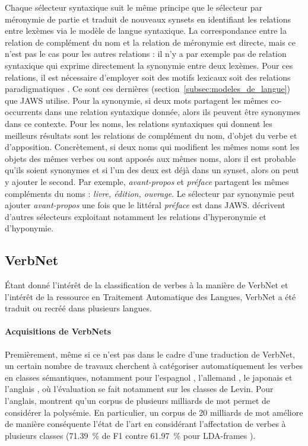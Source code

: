 Chaque sélecteur syntaxique suit le même principe que le sélecteur par
méronymie de partie et traduit de nouveaux synsets en identifiant les relations
entre lexèmes via le modèle de langue syntaxique. La correspondance entre la
relation de complément du nom et la relation de méronymie est directe, mais ce
n'est pas le cas pour les autres relations : il n'y a par exemple pas de
relation syntaxique qui exprime directement la synonymie entre deux lexèmes.
Pour ces relations, il est nécessaire d'employer soit des motifs lexicaux
\citep{hearst1992automatic} soit des relations paradigmatiques
\citep{lenci2012identifying}. Ce sont ces dernières
(section~\ref{subsec:modeles_de_langue}) que JAWS utilise. Pour la synonymie,
si deux mots partagent les mêmes co-occurrents dans une relation syntaxique
donnée, alors ils peuvent être synonymes dans ce contexte. Pour les noms, les
relations syntaxiques qui donnent les meilleurs résultats sont les relations de
complément du nom, d'objet du verbe et d'apposition. Concrètement, si deux noms
qui modifient les mêmes noms sont les objets des mêmes verbes ou sont apposés
aux mêmes noms, alors il est probable qu'ils soient synonymes et si l'un des
deux est déjà dans un synset, alors on peut y ajouter le second.  Par exemple,
\textit{avant-propos} et \textit{préface} partagent les mêmes compléments du
noms : \textit{livre, édition, ouvrage}. Le sélecteur par synonymie peut
ajouter \textit{avant-propos} une fois que le littéral \textit{préface} est
dans JAWS. \citep{mouton2010jaws,mouton2010phd} décrivent d'autres sélecteurs
exploitant notamment les relations d'hyperonymie et d'hyponymie.

\subsection{VerbNet}

Étant donné l'intérêt de la classification de verbes à la manière de VerbNet
\citep{hartshorne2014verbcorner} et l'intérêt de la ressource en Traitement
Automatique des Langues, VerbNet a été traduit ou recréé dans plusieurs
langues.

\paragraph{Acquisitions de VerbNets}

Premièrement, même si ce n'est pas dans le cadre d'une traduction de VerbNet,
un certain nombre de travaux cherchent à catégoriser automatiquement les verbes
en classes sémantiques, notamment pour l'espagnol \citep{ferrer2004towards},
l'allemand \citep{im2006experiments}, le japonais \citep{suzuki2009classifying}
et l'anglais
\citep{stevenson2003semi,lapata2004verb,vlachos2009unsupervised,lippincott2012learning,kawahara2014step},
où l'évaluation se fait notamment sur les classes de Levin. Pour l'anglais,
\citep{kawahara2014step} montrent qu'un corpus de plusieurs milliards de mot
permet de considérer la polysémie. En particulier, un corpus de 20 milliards de
mot améliore de manière conséquente l'état de l'art en considérant
l'affectation de verbes à plusieurs classes (71.39~\% de F1 contre 61.97~\%
pour LDA-frames \citep{materna2012lda}).

